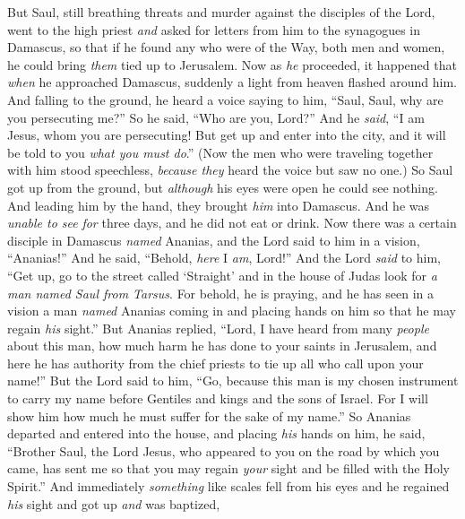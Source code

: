 \begin{biblechapter} %
 But Saul, still breathing threats and murder against the disciples of the Lord, went to the high priest
\verse \textit{and} asked for letters from him to the synagogues in Damascus, so that if he found any who were of the Way, both men and women, he could bring \textit{them} tied up to Jerusalem.
\verse Now as \textit{he} proceeded, it happened that \textit{when} he approached Damascus, suddenly a light from heaven flashed around him.
\verse And falling to the ground, he heard a voice saying to him, “Saul, Saul, why are you persecuting me?”
\verse So he said, “Who are you, Lord?” And he \textit{said}, “I am Jesus, whom you are persecuting!
\verse But get up and enter into the city, and it will be told to you \textit{what you must do}.”
\verse (Now the men who were traveling together with him stood speechless, \textit{because they} heard the voice but saw no one.)
\verse So Saul got up from the ground, but \textit{although} his eyes were open he could see nothing. And leading him by the hand, they brought \textit{him} into Damascus.
\verse And he was \textit{unable to see} \textit{for} three days, and he did not eat or drink.
 Now there was a certain disciple in Damascus \textit{named} Ananias, and the Lord said to him in a vision, “Ananias!” And he said, “Behold, \textit{here} I \textit{am}, Lord!”
\verse And the Lord \textit{said} to him, “Get up, go to the street called ‘Straight’ and in the house of Judas look for \textit{a man named Saul from Tarsus}. For behold, he is praying,
\verse and he has seen in a vision a man \textit{named} Ananias coming in and placing hands on him so that he may regain \textit{his} sight.”
\verse But Ananias replied, “Lord, I have heard from many \textit{people} about this man, how much harm he has done to your saints in Jerusalem,
\verse and here he has authority from the chief priests to tie up all who call upon your name!”
\verse But the Lord said to him, “Go, because this man is my chosen instrument to carry my name before Gentiles and kings and the sons of Israel.
\verse For I will show him how much he must suffer for the sake of my name.”
\verse So Ananias departed and entered into the house, and placing \textit{his} hands on him, he said, “Brother Saul, the Lord Jesus, who appeared to you on the road by which you came, has sent me so that you may regain \textit{your} sight and be filled with the Holy Spirit.”
\verse And immediately \textit{something} like scales fell from his eyes and he regained \textit{his} sight and got up \textit{and} was baptized,

\end{biblechapter}
